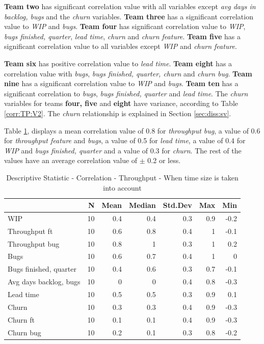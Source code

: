 \documentclass[UKenglish]{ifimaster}  %
\begin{document}
 \textbf{Team two} has significant correlation value with all variables except \textit{avg days in backlog, bugs} and the \textit{churn} variables.  \textbf{Team three} has a significant correlation value to \textit{WIP} and \textit{bugs}. \textbf{Team four} has significant correlation value to \textit{WIP}, \textit{bugs finished, quarter}, \textit{lead time}, \textit{churn} and \textit{churn feature}. \textbf{Team five} has a significant correlation value to all variables except \textit{WIP} and \textit{churn feature}. 

 
\textbf{Team six} has positive correlation value to \textit{lead time}. \textbf{Team eight} has a correlation value with \textit{bugs}, \textit{bugs finished, quarter, churn} and \textit{churn bug}. \textbf{Team nine} has a  significant correlation value to \textit{WIP} and \textit{bugs}. \textbf{Team ten} has a significant correlation to \textit{bugs}, \textit{bugs finished, quarter} and \textit{lead time}. 
The \textit{churn} variables for teams \textbf{four, five} and \textbf{eight} have variance, according to Table \ref{corr:TP:V2}. The \textit{churn} relationship is explained in Section \ref{sec:diss:sv}. 

Table \ref{DS:corr:TP:v2}, displays a mean correlation value of 0.8 for \textit{throughput bug}, a value of 0.6 for \textit{throughput feature} and \textit{bugs}, a value of 0.5 for \textit{lead time}, a value of 0.4 for \textit{WIP} and \textit{bugs finished, quarter} and a value of 0.3 for \textit{churn}. The rest of the values have an average correlation value of $\pm$ 0.2 or less. 
 
\begin{table}[!htbp]
 \centering
 \begin{tabular}{ | l | r | r | r | r | r | r | }
 \hline
& \bf{N} & \bf{Mean} & \bf{Median} & \bf{Std.Dev} & \bf{Max} & \bf{Min} \\ \hline
WIP  & 10 & 0.4 & 0.4 & 0.3 & 0.9 & -0.2\\ \hline
Throughput ft  & 10 & 0.6 & 0.8 & 0.4 & 1 & -0.1\\ \hline
Throughput bug  & 10 & 0.8 & 1 & 0.3 & 1 & 0.2\\ \hline
Bugs  & 10 & 0.6 & 0.7 & 0.4 & 1 & 0\\ \hline
Bugs finished, quarter  & 10 & 0.4 & 0.6 & 0.3 & 0.7 & -0.1\\ \hline
Avg days backlog, bugs  & 10 & 0 & 0 & 0.4 & 0.8 & -0.3\\ \hline
Lead time & 10 & 0.5 & 0.5 & 0.3 & 0.9 & 0.1\\ \hline
Churn  & 10 & 0.3 & 0.3 & 0.4 & 0.9 & -0.3\\ \hline
Churn ft  & 10 & 0.1 & 0.1 & 0.4 & 0.9 & -0.3\\ \hline
Churn bug  & 10 & 0.2 & 0.1 & 0.3 & 0.8 & -0.2\\ \hline
\end{tabular}
 \caption{Descriptive Statistic - Correlation - Throughput - When time size is taken into account}
 \label{DS:corr:TP:v2}
 \end{table}
 
\end{document}
